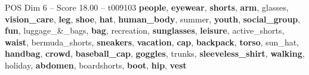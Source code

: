 \begin{textsample}{POS Dim 6 – Score 18.00 – t009103}  \label{ex:f6_pos_010}
\textbf{people}, \textbf{eyewear}, \textbf{shorts}, \textbf{arm}, glasses, \textbf{vision\_care}, \textbf{leg}, \textbf{shoe}, \textbf{hat}, \textbf{human\_body}, summer, \textbf{youth}, \textbf{social\_group}, \textbf{fun}, luggage\_\&\_bags, \textbf{bag}, recreation, \textbf{sunglasses}, \textbf{leisure}, active\_shorts, \textbf{waist}, bermuda\_shorts, \textbf{sneakers}, \textbf{vacation}, \textbf{cap}, \textbf{backpack}, \textbf{torso}, sun\_hat, \textbf{handbag}, \textbf{crowd}, \textbf{baseball\_cap}, \textbf{goggles}, trunks, \textbf{sleeveless\_shirt}, \textbf{walking}, holiday, \textbf{abdomen}, boardshorts, \textbf{boot}, \textbf{hip}, \textbf{vest}

\end{textsample}
